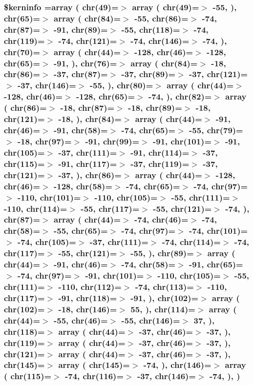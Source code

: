 \hypertarget{ctimesbi_8php_ab4bb7d3b0332c517f6a42a1924f01000}{
\subsubsection[{\$kerninfo}]{\setlength{\rightskip}{0pt plus 5cm}\$kerninfo =array ( chr(49)=$>$ array ( chr(49)=$>$ -\/55, ), chr(65)=$>$ array ( chr(84)=$>$ -\/55, chr(86)=$>$ -\/74, chr(87)=$>$ -\/91, chr(89)=$>$ -\/55, chr(118)=$>$ -\/74, chr(119)=$>$ -\/74, chr(121)=$>$ -\/74, chr(146)=$>$ -\/74, ), chr(70)=$>$ array ( chr(44)=$>$ -\/128, chr(46)=$>$ -\/128, chr(65)=$>$ -\/91, ), chr(76)=$>$ array ( chr(84)=$>$ -\/18, chr(86)=$>$ -\/37, chr(87)=$>$ -\/37, chr(89)=$>$ -\/37, chr(121)=$>$ -\/37, chr(146)=$>$ -\/55, ), chr(80)=$>$ array ( chr(44)=$>$ -\/128, chr(46)=$>$ -\/128, chr(65)=$>$ -\/74, ), chr(82)=$>$ array ( chr(86)=$>$ -\/18, chr(87)=$>$ -\/18, chr(89)=$>$ -\/18, chr(121)=$>$ -\/18, ), chr(84)=$>$ array ( chr(44)=$>$ -\/91, chr(46)=$>$ -\/91, chr(58)=$>$ -\/74, chr(65)=$>$ -\/55, chr(79)=$>$ -\/18, chr(97)=$>$ -\/91, chr(99)=$>$ -\/91, chr(101)=$>$ -\/91, chr(105)=$>$ -\/37, chr(111)=$>$ -\/91, chr(114)=$>$ -\/37, chr(115)=$>$ -\/91, chr(117)=$>$ -\/37, chr(119)=$>$ -\/37, chr(121)=$>$ -\/37, ), chr(86)=$>$ array ( chr(44)=$>$ -\/128, chr(46)=$>$ -\/128, chr(58)=$>$ -\/74, chr(65)=$>$ -\/74, chr(97)=$>$ -\/110, chr(101)=$>$ -\/110, chr(105)=$>$ -\/55, chr(111)=$>$ -\/110, chr(114)=$>$ -\/55, chr(117)=$>$ -\/55, chr(121)=$>$ -\/74, ), chr(87)=$>$ array ( chr(44)=$>$ -\/74, chr(46)=$>$ -\/74, chr(58)=$>$ -\/55, chr(65)=$>$ -\/74, chr(97)=$>$ -\/74, chr(101)=$>$ -\/74, chr(105)=$>$ -\/37, chr(111)=$>$ -\/74, chr(114)=$>$ -\/74, chr(117)=$>$ -\/55, chr(121)=$>$ -\/55, ), chr(89)=$>$ array ( chr(44)=$>$ -\/91, chr(46)=$>$ -\/74, chr(58)=$>$ -\/91, chr(65)=$>$ -\/74, chr(97)=$>$ -\/91, chr(101)=$>$ -\/110, chr(105)=$>$ -\/55, chr(111)=$>$ -\/110, chr(112)=$>$ -\/74, chr(113)=$>$ -\/110, chr(117)=$>$ -\/91, chr(118)=$>$ -\/91, ), chr(102)=$>$ array ( chr(102)=$>$ -\/18, chr(146)=$>$ 55, ), chr(114)=$>$ array ( chr(44)=$>$ -\/55, chr(46)=$>$ -\/55, chr(146)=$>$ 37, ), chr(118)=$>$ array ( chr(44)=$>$ -\/37, chr(46)=$>$ -\/37, ), chr(119)=$>$ array ( chr(44)=$>$ -\/37, chr(46)=$>$ -\/37, ), chr(121)=$>$ array ( chr(44)=$>$ -\/37, chr(46)=$>$ -\/37, ), chr(145)=$>$ array ( chr(145)=$>$ -\/74, ), chr(146)=$>$ array ( chr(115)=$>$ -\/74, chr(116)=$>$ -\/37, chr(146)=$>$ -\/74, ), )}}\label{ctimesbi_8php_ab4bb7d3b0332c517f6a42a1924f01000}


